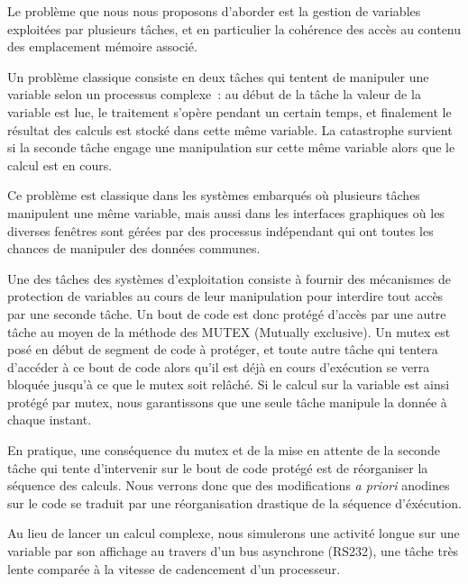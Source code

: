 Le probl\`eme que nous nous proposons d'aborder est la gestion de variables exploit\'ees
par plusieurs t\^aches, et en particulier la coh\'erence des acc\`es au contenu des 
emplacement m\'emoire associ\'e. 

Un probl\`eme classique consiste en deux t\^aches qui tentent de manipuler une variable
selon un processus complexe~: au d\'ebut de la t\^ache la valeur de la variable est lue,
le traitement s'op\`ere pendant un certain temps, et finalement le r\'esultat des 
calculs est stock\'e dans cette m\^eme variable. La catastrophe survient si la seconde
t\^ache engage une manipulation sur cette m\^eme variable alors que le calcul est en cours.

Ce probl\`eme est classique dans les syst\`emes embarqu\'es o\`u plusieurs t\^aches manipulent
une m\^eme variable, mais aussi dans les interfaces graphiques o\`u les diverses fen\^etres
sont g\'er\'ees par des processus ind\'ependant qui ont toutes les chances de manipuler des
donn\'ees communes.

Une des t\^aches des syst\`emes d'exploitation consiste \`a fournir des m\'ecanismes de
protection de variables au cours de leur manipulation pour interdire tout acc\`es par une
seconde t\^ache. Un bout de code est donc prot\'eg\'e d'acc\`es par une autre t\^ache au
moyen de la m\'ethode des MUTEX (Mutually exclusive). Un mutex est pos\'e en d\'ebut de
segment de code \`a prot\'eger, et toute autre t\^ache qui tentera d'acc\'eder \`a ce bout
de code alors qu'il est d\'ej\`a en cours d'ex\'ecution se verra bloqu\'ee jusqu'\`a ce 
que le mutex soit rel\^ach\'e. Si le calcul sur la variable est ainsi prot\'eg\'e par mutex,
nous garantissons que une seule t\^ache manipule la donn\'ee \`a chaque instant.

En pratique, une cons\'equence du mutex et de la mise en attente de la seconde t\^ache qui
tente d'intervenir sur le bout de code prot\'eg\'e est de r\'eorganiser la s\'equence des
calculs. Nous verrons donc que des modifications {\em a priori} anodines sur le code se
traduit par une r\'eorganisation drastique de la s\'equence d'\'ex\'ecution.

Au lieu de lancer un calcul complexe, nous simulerons une activit\'e longue sur une 
variable par son affichage au travers d'un bus asynchrone (RS232), une t\^ache tr\`es
lente compar\'ee \`a la vitesse de cadencement d'un processeur.
